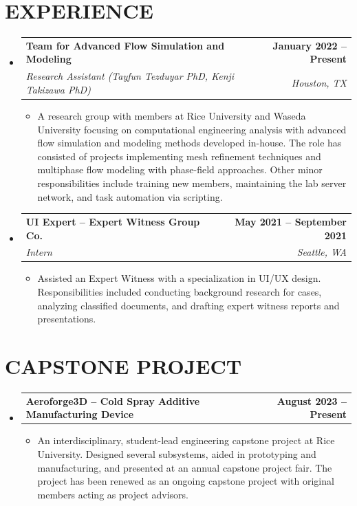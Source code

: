 \documentclass[letterpaper,11pt]{article}
\makeatletter
\newcommand{\resumeItem}[1]{
  \item \small{
    {#1 \vspace{-2pt}}
  }
}
\newcommand{\resumeSubheading}[4]{
  \vspace{-2pt}\item
    \begin{tabular*}{1.0\textwidth}[t]{l@{\extracolsep{\fill}}r}
      \textbf{#1} & \textbf{\small #2} \\
      \textit{\small#3} & \textit{\small #4} \\
    \end{tabular*}\vspace{-7pt}
}
\newcommand{\projectSubheading}[2]{
  \vspace{-2pt}\item
    \begin{tabular*}{1.0\textwidth}[t]{l@{\extracolsep{\fill}}r}
      \textbf{#1} & \textbf{\small #2} \\
    \end{tabular*}\vspace{-7pt}
}
\newcommand{\resumeSubHeadingListStart}{\begin{itemize}[leftmargin=0.0in, label={}]}
\newcommand{\resumeSubHeadingListEnd}{\end{itemize}}
\newcommand{\resumeItemListStart}{\begin{itemize}}
\newcommand{\resumeItemListEnd}{\end{itemize}\vspace{-5pt}}
\makeatother
\begin{document}
\section{EXPERIENCE}
  \resumeSubHeadingListStart

    \resumeSubheading
      {Team for Advanced Flow Simulation and Modeling}{January 2022 -- Present}
      {Research Assistant (Tayfun Tezduyar PhD, Kenji Takizawa PhD)}{Houston, TX}
      \resumeItemListStart
        \resumeItem{A research group with members at Rice University and Waseda University focusing on computational engineering analysis with advanced flow simulation and modeling methods developed in-house. The role has consisted of projects implementing mesh refinement techniques and multiphase flow modeling with phase-field approaches. Other minor responsibilities include training new members, maintaining the lab server network, and task automation via scripting.}
      \resumeItemListEnd   
    \vspace{-12pt}
    \resumeSubheading
      {UI Expert -- Expert Witness Group Co.}{May 2021 -- September 2021}
      {Intern}{Seattle, WA}
      \resumeItemListStart
        \resumeItem{Assisted an Expert Witness with a specialization in UI/UX design. Responsibilities included conducting background research for cases, analyzing classified documents, and drafting expert witness reports and presentations.}
      \resumeItemListEnd   
 
    \resumeSubHeadingListEnd
 \vspace{-10pt}

\section{CAPSTONE PROJECT}

    \resumeSubHeadingListStart
      \projectSubheading
        {Aeroforge3D -- Cold Spray Additive Manufacturing Device}{August 2023 -- Present}
        \resumeItemListStart
          \resumeItem{An interdisciplinary, student-lead engineering capstone project at Rice University. Designed several subsystems, aided in prototyping and manufacturing, and presented at an annual capstone project fair. The project has been renewed as an ongoing capstone project with original members acting as project advisors.}
        \resumeItemListEnd   
  \resumeSubHeadingListEnd
\vspace{-10pt}

\end{document}
